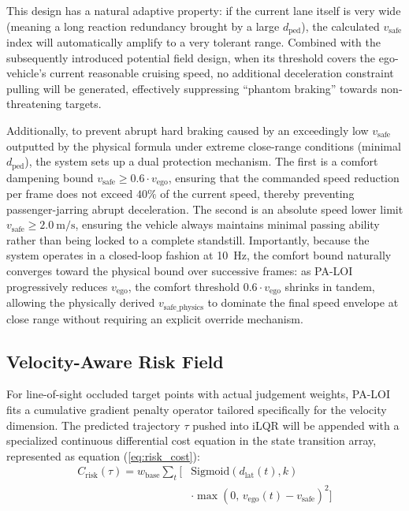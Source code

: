 \documentclass[letterpaper, 10 pt, conference]{ieeeconf}  %
\begin{document}
This design has a natural adaptive property: if the current lane itself is very wide (meaning a long reaction redundancy brought by a large $d_{\text{ped}}$), the calculated $v_{\text{safe}}$ index will automatically amplify to a very tolerant range. Combined with the subsequently introduced potential field design, when its threshold covers the ego-vehicle's current reasonable cruising speed, no additional deceleration constraint pulling will be generated, effectively suppressing ``phantom braking'' towards non-threatening targets.

Additionally, to prevent abrupt hard braking caused by an exceedingly low $v_{\text{safe}}$ outputted by the physical formula under extreme close-range conditions (minimal $d_{\text{ped}}$), the system sets up a dual protection mechanism. The first is a comfort dampening bound $v_{\text{safe}} \geq 0.6 \cdot v_{\text{ego}}$, ensuring that the commanded speed reduction per frame does not exceed $40\%$ of the current speed, thereby preventing passenger-jarring abrupt deceleration. The second is an absolute speed lower limit $v_{\text{safe}} \geq \SI{2.0}{\meter\per\second}$, ensuring the vehicle always maintains minimal passing ability rather than being locked to a complete standstill. Importantly, because the system operates in a closed-loop fashion at \SI{10}{\hertz}, the comfort bound naturally converges toward the physical bound over successive frames: as PA-LOI progressively reduces $v_{\text{ego}}$, the comfort threshold $0.6 \cdot v_{\text{ego}}$ shrinks in tandem, allowing the physically derived $v_{\text{safe\_physics}}$ to dominate the final speed envelope at close range without requiring an explicit override mechanism.

\subsection{Velocity-Aware Risk Field}
For line-of-sight occluded target points with actual judgement weights, PA-LOI fits a cumulative gradient penalty operator tailored specifically for the velocity dimension. The predicted trajectory $\tau$ pushed into iLQR will be appended with a specialized continuous differential cost equation in the state transition array, represented as equation (\ref{eq:risk_cost}):
\begin{equation}
\begin{split}
    C_{\text{risk}}(\tau) = w_{\text{base}} \sum_{t} \Big[ &\text{Sigmoid}(d_{\text{lat}}(t), k) \\
    &\cdot \max(0,\, v_{\text{ego}}(t) - v_{\text{safe}})^2 \Big]
\end{split}
    \label{eq:risk_cost}
\end{equation}
\end{document}
